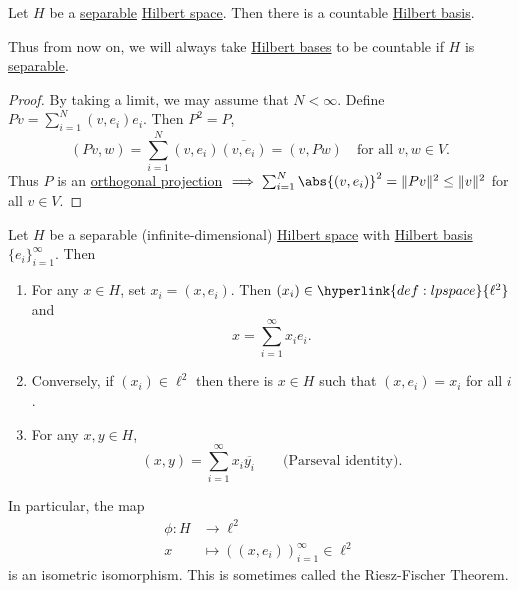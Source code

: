 \documentclass{article}
\begin{document}
\begin{cor}
    Let $H$ be a \hyperlink{def:separable}{separable} \hyperlink{def:euclidean}{Hilbert space}. Then there is a countable \hyperlink{def:ons}{Hilbert basis}.
\end{cor}
Thus from now on, we will always take \hyperlink{def:ons}{Hilbert bases} to be countable if $H$ is \hyperlink{def:separable}{separable}.


\begin{proof}
    By taking a limit, we may assume that $N < \infty$. Define $Pv = \sum_{i=1}^N (v, e_i) e_i$. Then $P^2 = P$,
    \begin{equation*}
        (Pv, w) = \sum_{i=1}^N (v, e_i) \overline{(v, e_i)} = (v, Pw) \quad \text{for all } v, w \in V.
    \end{equation*}
    Thus $P$ is an \hyperlink{def:proj}{orthogonal projection} $\implies \sum_{i=1}^N \abs{(v, e_i)}^2 = \|Pv\|^2 \leq \|v\|^2$ for all $v \in V$.
\end{proof}

\begin{prop}
    Let $H$ be a separable (infinite-dimensional) \hyperlink{def:euclidean}{Hilbert space} with \hyperlink{def:ons}{Hilbert basis} $\{e_i\}_{i=1}^\infty$. Then
    \begin{enumerate}[label=(\roman*)]
        \item For any $x \in H$, set $x_i = (x, e_i)$. Then $(x_i) \in \hyperlink{def:lpspace}{\ell^2}$ and
            \begin{equation*}
                x = \sum_{i=1}^\infty x_i e_i.
            \end{equation*}
        \item Conversely, if $(x_i) \in \ell^2$ then there is $x \in H$ such that $(x, e_i) = x_i$ for all $i$.
        \item For any $x, y \in H$,
            \begin{equation*}
                (x, y) = \sum_{i=1}^\infty x_i \overline{y_i} \qquad \text{(Parseval identity)}.
            \end{equation*}
    \end{enumerate}
    In particular, the map
    \begin{align*}
        \phi: H &\longrightarrow \ell^2 \\
        x &\longmapsto ((x, e_i))_{i=1}^\infty \in \ell^2
    \end{align*}
    is an isometric isomorphism. This is sometimes called the Riesz-Fischer Theorem.
\end{prop}
\end{document}
